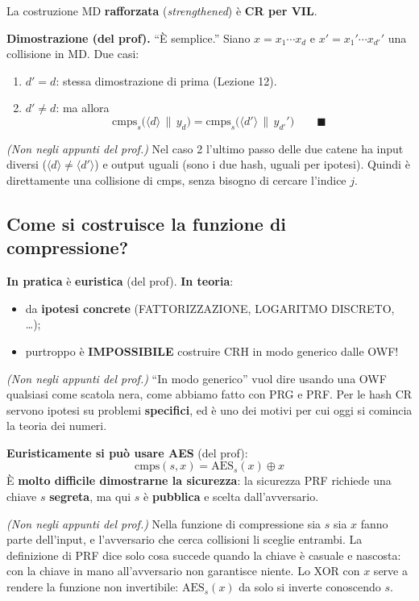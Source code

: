 La costruzione MD \textbf{rafforzata} (\emph{strengthened}) è \textbf{CR per VIL}.

\textbf{Dimostrazione (del prof).} ``È semplice.'' Siano \(x = x_1 \cdots x_d\) e \(x' = x_1' \cdots x_{d'}'\) una collisione in MD. Due casi:
\begin{enumerate}
  \item \(d' = d\): stessa dimostrazione di prima (Lezione 12).
  \item \(d' \ne d\): ma allora
  \[
  \text{cmps}_s\big(\langle d \rangle \,\|\, y_d\big) = \text{cmps}_s\big(\langle d' \rangle \,\|\, y_{d'}'\big) \qquad \blacksquare
  \]
\end{enumerate}

\begin{nota}
\emph{(Non negli appunti del prof.)} Nel caso 2 l'ultimo passo delle due catene ha input diversi (\(\langle d \rangle \ne \langle d' \rangle\)) e output uguali (sono i due hash, uguali per ipotesi). Quindi è direttamente una collisione di cmps, senza bisogno di cercare l'indice \(j\).
\end{nota}

\subsection{Come si costruisce la funzione di compressione?}

\textbf{In pratica} è \textbf{euristica} (del prof). \textbf{In teoria}:
\begin{itemize}
  \item da \textbf{ipotesi concrete} (FATTORIZZAZIONE, LOGARITMO DISCRETO, \dots);
  \item purtroppo è \textbf{IMPOSSIBILE} costruire CRH in modo generico dalle OWF!
\end{itemize}

\emph{(Non negli appunti del prof.)} ``In modo generico'' vuol dire usando una OWF qualsiasi come scatola nera, come abbiamo fatto con PRG e PRF. Per le hash CR servono ipotesi su problemi \textbf{specifici}, ed è uno dei motivi per cui oggi si comincia la teoria dei numeri.

\textbf{Euristicamente si può usare AES} (del prof):
\[
\text{cmps}(s, x) = \text{AES}_s(x) \oplus x
\]
È \textbf{molto difficile dimostrarne la sicurezza}: la sicurezza PRF richiede una chiave \(s\) \textbf{segreta}, ma qui \(s\) è \textbf{pubblica} e scelta dall'avversario.

\begin{nota}
\emph{(Non negli appunti del prof.)} Nella funzione di compressione sia \(s\) sia \(x\) fanno parte dell'input, e l'avversario che cerca collisioni li sceglie entrambi. La definizione di PRF dice solo cosa succede quando la chiave è casuale e nascosta: con la chiave in mano all'avversario non garantisce niente. Lo XOR con \(x\) serve a rendere la funzione non invertibile: \(\text{AES}_s(x)\) da solo si inverte conoscendo \(s\).
\end{nota}

